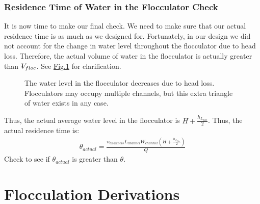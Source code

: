 \documentclass[letterpaper,10pt,english]{sphinxmanual}
\let\sphinxpxdimen\pdfpxdimen\else\newdimen\sphinxpxdimen
\begin{document}
\subsection{Residence Time of Water in the Flocculator Check}
\label{\detokenize{Flocculation/Floc_Design:residence-time-of-water-in-the-flocculator-check}}
It is now time to make our final check. We need to make sure that our actual residence time is  as much as we designed for. Fortunately, in our design we did not account for the change in water level throughout the flocculator due to head loss. Therefore, the actual volume of water in the flocculator is actually greater than \(\rlap{-} V_{floc}\). See \hyperref[\detokenize{Flocculation/Floc_Design:figure-flocculator-head-loss}]{Fig.\@ \ref{\detokenize{Flocculation/Floc_Design:figure-flocculator-head-loss}}} for clarification.

\begin{figure}[htbp]
\centering
\capstart

\noindent\sphinxincludegraphics[width=400\sphinxpxdimen]{{Flocculator_head_loss}.jpg}
\caption{The water level in the flocculator decreases due to head loss. Flocculators may occupy multiple channels, but this extra triangle of water exists in any case.}\label{\detokenize{Flocculation/Floc_Design:id19}}\label{\detokenize{Flocculation/Floc_Design:figure-flocculator-head-loss}}\end{figure}

Thus, the actual average water level in the flocculator is \(H + \frac{h_{L_{floc}}}{2}\). Thus, the actual residence time is:
\begin{equation}\label{equation:Flocculation/Floc_Design:Flocculation/Floc_Design:31}
\begin{split}\theta_{actual} = \frac{n_{channels} L_{channel} W_{channel} \left( H + \frac{h_{L_{floc}}}{2} \right)} {Q}\end{split}
\end{equation}
Check to see if \(\theta_{actual}\) is greater than \(\theta\).




\chapter{Flocculation Derivations}
\label{\detokenize{Flocculation/Floc_Derivations:flocculation-derivations}}\label{\detokenize{Flocculation/Floc_Derivations:title-flocculation-derivations}}\label{\detokenize{Flocculation/Floc_Derivations::doc}}
\end{document}
